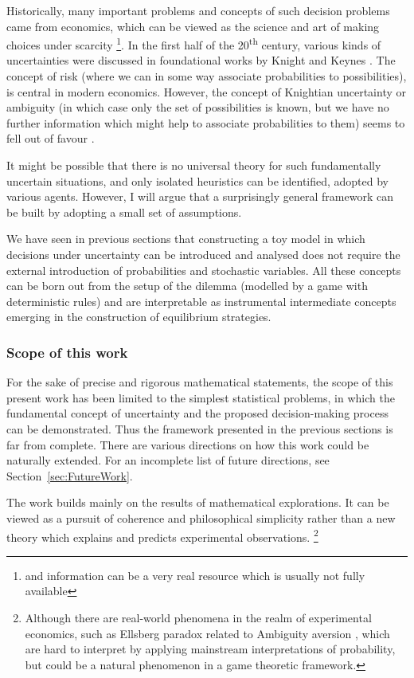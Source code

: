 \documentclass{article}
\theoremstyle{definition}
\begin{document}
Historically, many important problems and concepts of such decision problems came from economics, which can be viewed as the science and art of making choices under scarcity \footnote{and information can be a very real resource which is usually not fully available}.
In the first half of the 20\textsuperscript{th} century, various kinds of uncertainties were discussed in foundational works by Knight \cite{book:Knight} and Keynes \cite{book:Keynes}.
The concept of risk (where we can in some way associate probabilities to possibilities), is central in modern economics. However, the concept of Knightian uncertainty or ambiguity (in which case only the set of possibilities is known, but we have no further information which might help to associate probabilities to them) seems to fell out of favour \cite{book:JuliaUncertainty}.

It might be possible that there is no universal theory for such fundamentally uncertain situations, and only isolated heuristics can be identified, adopted by various agents.
However, I will argue that a surprisingly general framework can be built by adopting a small set of assumptions.

We have seen in previous sections that constructing a toy model in which decisions under uncertainty can be introduced and analysed does not require the external introduction of probabilities and stochastic variables. All these concepts can be born out from the setup of the dilemma (modelled by a game with deterministic rules) and are interpretable as instrumental intermediate concepts emerging in the construction of equilibrium strategies.

\subsubsection{Scope of this work}

For the sake of precise and rigorous mathematical statements, the scope of this present work has been limited to the simplest statistical problems, in which the fundamental concept of uncertainty and the proposed decision-making process can be demonstrated.
Thus the framework presented in the previous sections is far from complete.
There are various directions on how this work could be naturally extended. For an incomplete list of future directions, see Section~\ref{sec:FutureWork}.

The work builds mainly on the results of mathematical explorations. It can be viewed as a pursuit of coherence and philosophical simplicity rather than a new theory which explains and predicts experimental observations. \footnote{Although there are real-world phenomena in the realm of experimental economics, such as Ellsberg paradox \cite{paper:Ellsberg} related to Ambiguity aversion \cite{book:EconomicsDictionary,paper:GilboaSchmeidler}, which are hard to interpret by applying mainstream interpretations of probability, but could be a natural phenomenon in a game theoretic framework.}
\end{document}
